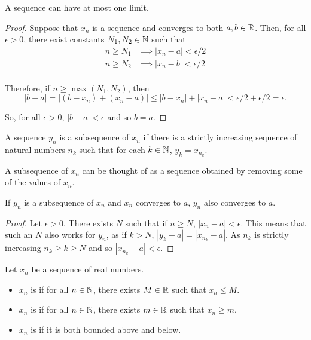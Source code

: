 \begin{theorem}
  A sequence can have at most one limit.
\end{theorem}

\begin{proof}
  Suppose that \(x_{n}\) is a sequence and converges to both \(a, b \in \mathbb{R}\). Then, for all \(\epsilon > 0\), there exist constants \(N_{1}, N_{2} \in \mathbb{N}\) such that
  \begin{align*}
    n \geq N_{1} &\implies |x_{n} - a | < \epsilon / 2 \\
    n \geq N_{2} &\implies |x_{n} - b | < \epsilon / 2 \\
  \end{align*}

  Therefore, if \(n \geq \max(N_{1}, N_{2})\), then
  \[|b - a| = |(b - x_{n}) + (x_{n} - a)| \leq |b - x_{n}| + |x_{n} - a| < \epsilon / 2 + \epsilon / 2 = \epsilon. \]

  So, for all \(\epsilon > 0\), \(|b - a| < \epsilon\) and so \(b = a\).
\end{proof}


\begin{definition}
  A sequence \(y_{n}\) is a subsequence of \(x_{n}\) if there is a strictly increasing sequence of natural numbers \(n_{k}\) such that for each \(k \in \mathbb{N}\), \(y_{k} = x_{n_{k}}\).
\end{definition}

A subsequence of \(x_{n}\) can be thought of as a sequence obtained by removing some of the values of \(x_{n}\).


\begin{lemma}
  If \(y_{n}\) is a subsequence of \(x_{n}\) and \(x_{n}\) converges to \(a\), \(y_{n}\) also converges to \(a\).
\end{lemma}

\begin{proof}
  Let \(\epsilon > 0\). There exists \(N\) such that if \(n \geq N\), \(|x_{n} - a| < \epsilon\). This means that such an \(N\) also works for \(y_{n}\), as if \(k > N\), \(|y_{k} - a| = |x_{n_{k}} - a|\). As \(n_{k}\) is strictly increasing \(n_{k} \geq k \geq N\) and so \(|x_{n_{k}} - a| < \epsilon\).
\end{proof}

\begin{definition}
  Let \(x_{n}\) be a sequence of real numbers.
  \begin{itemize}
  \item \(x_{n}\) is  if for all \(n \in \mathbb{N}\), there exists \(M \in \mathbb{R}\) such that \(x_{n} \leq M\).
  \item \(x_{n}\) is  if for all \(n \in \mathbb{N}\), there exists \(m \in \mathbb{R}\) such that \(x_{n} \geq m\).
  \item \(x_{n}\) is  if it is both bounded above and below.
  \end{itemize}
\end{definition}

